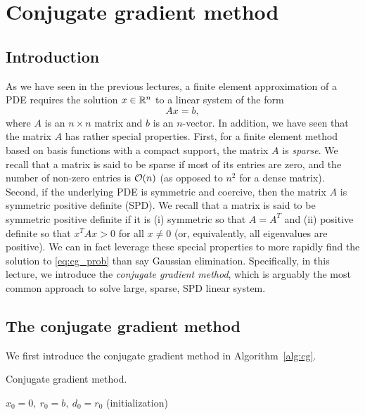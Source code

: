 \chapter{Conjugate gradient method}

\section{Introduction}
As we have seen in the previous lectures, a finite element approximation of a PDE requires the solution $x \in \mathbb{R}^n$ to a linear system of the form
\begin{equation}
  Ax = b,
  \label{eq:cg_prob}
\end{equation}
where $A$ is an $n \times n$ matrix and $b$ is an $n$-vector.  In addition, we have seen that the matrix $A$ has rather special properties. First, for a finite element method based on basis functions with a compact support, the matrix $A$ is \emph{sparse}. We recall that a matrix is said to be sparse if most of its entries are zero, and the number of non-zero entries is $\mathcal{O}(n)$ (as opposed to $n^2$ for a dense matrix). Second, if the underlying PDE is symmetric and coercive, then the matrix $A$ is symmetric positive definite (SPD).  We recall that a matrix is said to be symmetric positive definite if it is (i) symmetric so that $A = A^T$ and (ii) positive definite so that $x^T A x > 0$ for all $x \neq 0$ (or, equivalently, all eigenvalues are positive).  We can in fact leverage these special properties to more rapidly find the solution to \eqref{eq:cg_prob} than say Gaussian elimination.  Specifically, in this lecture, we introduce the \emph{conjugate gradient method}, which is arguably the most common approach to solve large, sparse, SPD linear system.  


\section{The conjugate gradient method}
We first introduce the conjugate gradient method in Algorithm~\ref{alg:cg}.
\begin{algorithm}
  \caption{Conjugate gradient method. \label{alg:cg}}

  $x_0 =0, \ r_0 = b, \ d_0 = r_0$ \hfill (initialization) \\
\end{algorithm}


